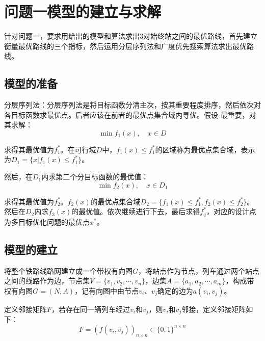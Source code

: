 \documentclass[UTF8]{ctexart}
\begin{document}
\section{问题一模型的建立与求解}
针对问题一，要求用给出的模型和算法求出3对始终站之间的最优路线，首先建立衡量最优路线的三个指标，然后运用分层序列法和广度优先搜索算法求出最优路线。

\subsection{模型的准备}
分层序列法：分层序列法是将目标函数分清主次，按其重要程度排序，然后依次对各目标函数求最优点。后者应该在前者的最优点集合域内寻优。假设 最重要，对其求解：
$$\min f_1(x), \quad x \in D$$

求得其最优值为$f_1^*$。在可行域$D$中，$f_1(x) \leq f_1^*$的区域称为最优点集合域，表示为$D_1 = \{x|f_1(x) \leq f_1^*\}$。

然后，在$D_1$内求第二个分目标函数的最优值：
$$\min f_2(x), \quad x \in D_1$$

求得其最优值为$f_2^*$。$f_2(x)$的最优点集合域$D_2 = \{f_1(x)\leq f_1^*, f_2(x)\leq f_2^*\}$。 然后在$D_2$内求$f_3(x)$的最优值。依次继续进行下去，最后求得$f_q^*$，对应的设计点为多目标优化问题的最优点$x^*$。

\subsection{模型的建立}
将整个铁路线路网建立成一个带权有向图$G$，将站点作为节点，列车通过两个站点之间的线路作为边，节点集$V = \{v_1,v_2,\cdots,v_n\}$，边集$A = \{a_1,a_2,\cdots,a_m\}$，构成带权有向图$G = (N,A)$，记有向图中由节点$v_i$、$v_j$确定的边为$a(v_i,v_j)$。

定义邻接矩阵$F$，若存在同一辆列车经过$v_i$和$v_j$，则$v_i$和$v_j$邻接，定义邻接矩阵如下：
$$F = (f(v_i,v_j))_{n\times n} \in \{0,1\}^{n \times n}$$
\end{document}
